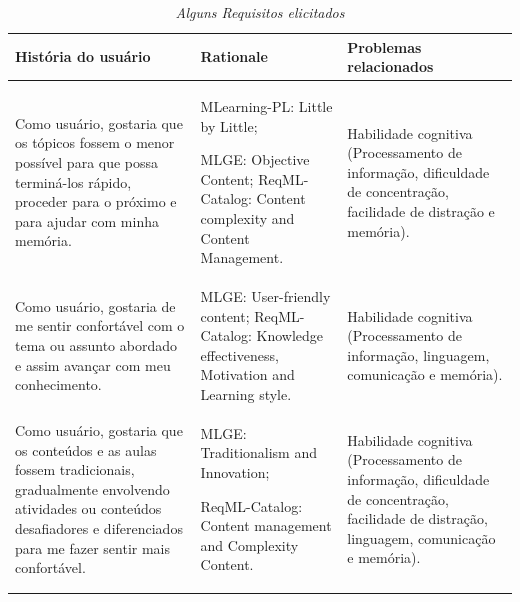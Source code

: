 \begin{table}[!ht]
\centering
\caption{\textit{Alguns Requisitos elicitados}}
\centering
\footnotesize
\begin{tabular}{p{5cm} p{5cm} p{5cm}}
\toprule
\textbf{História do usuário} & \textbf{Rationale} & \textbf{Problemas relacionados}                                   
\\ \midrule
Como usuário, gostaria que os tópicos fossem o menor possível para que possa terminá-los rápido, proceder para o próximo e para ajudar com minha memória.
& 
MLearning-PL: Little by Little;

MLGE: Objective Content; ReqML-Catalog: Content complexity and Content Management.
&
Habilidade cognitiva (Processamento de informação, dificuldade de concentração, facilidade de distração e memória).
\\ \midrule
Como usuário, gostaria de me sentir confortável com o tema ou assunto abordado e assim avançar com meu conhecimento.
& 
MLGE: User-friendly content; ReqML-Catalog: Knowledge effectiveness, Motivation and Learning style.
&
Habilidade cognitiva (Processamento de informação, linguagem, comunicação e memória).
\\ \midrule
Como usuário, gostaria que os conteúdos e as aulas fossem tradicionais, gradualmente envolvendo atividades ou conteúdos desafiadores e diferenciados para me fazer sentir mais confortável.
& 
MLGE: Traditionalism and Innovation;

ReqML-Catalog: Content management and Complexity Content.
&
Habilidade cognitiva (Processamento de informação, dificuldade de concentração, facilidade de distração, linguagem, comunicação e memória).
\\ \midrule

\end{tabular}
\label{tab:requisitos}
\end{table}




